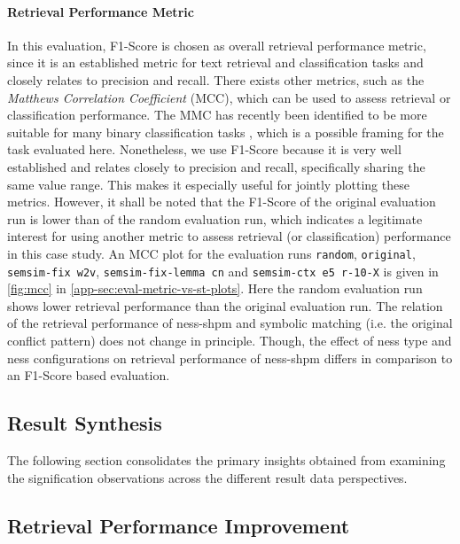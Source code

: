 \documentclass[11pt, numbers=noenddot]{scrreprt}
\let\cite\parencite  %
\begin{document}
\paragraph{Retrieval Performance Metric}
In this evaluation, F1-Score is chosen as overall retrieval performance metric, since it is an established metric for text retrieval and classification tasks and closely relates to precision and recall. There exists other metrics, such as the \textit{Matthews Correlation Coefficient} (MCC), which can be used to assess retrieval or classification performance. The MMC has recently been identified to be more suitable for many binary classification tasks \cite{chiccoAdvantagesMatthewsCorrelation2020}, which is a possible framing for the task evaluated here. Nonetheless, we use F1-Score because it is very well established and relates closely to precision and recall, specifically sharing the same value range. This makes it especially useful for jointly plotting these metrics. However, it shall be noted that the F1-Score of the original evaluation run is lower than of the random evaluation run, which indicates a legitimate interest for using another metric to assess retrieval (or classification) performance  in this case study. An MCC plot for the evaluation runs \texttt{random}, \texttt{original}, \texttt{semsim-fix w2v}, \texttt{semsim-fix-lemma cn} and \texttt{semsim-ctx e5 r-10-X} is given in \cref{fig:mcc} in \cref{app-sec:eval-metric-vs-st-plots}. Here the random evaluation run shows lower retrieval performance than the original evaluation run. The relation of the retrieval performance of \gls{ness-shpm} and symbolic matching (i.e. the original conflict pattern) does not change in principle. Though, the effect of \gls{ness} type and \gls{ness} configurations on retrieval performance of \gls{ness-shpm} differs in comparison to an F1-Score based evaluation.

\subsection*{\large{Result Synthesis}} 
The following section consolidates the primary insights obtained from examining the signification observations across the different result data perspectives.

\subsection{Retrieval Performance Improvement}
\label{sec:result-retrieval-performance-improvement}
\end{document}
